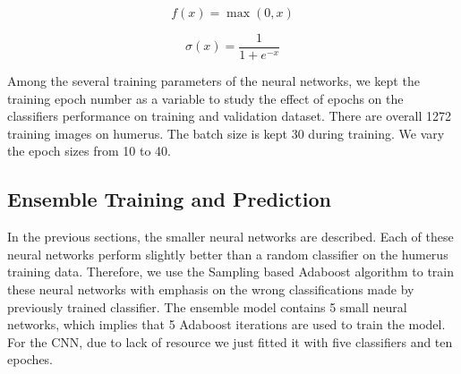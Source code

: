 \documentclass{article}
\begin{document}
\begin{equation}
    f(x)=\max(0,x)
    \label{relu}
\end{equation}

\begin{equation}
    \sigma(x)=\frac{1}{1+e^{-x}}
    \label{sigm}
\end{equation}

Among the several training parameters of the neural networks, we kept the training epoch number as a variable to study the effect of epochs on the classifiers performance on training and validation dataset. There are overall 1272 training images on humerus. The batch size is kept 30 during training. We vary the epoch sizes from 10 to 40.


\subsection{Ensemble Training and Prediction}
In the previous sections, the smaller neural networks are described. Each of these neural networks perform slightly better than a random classifier on the humerus training data. Therefore, we use the Sampling based Adaboost algorithm to train these neural networks with emphasis on the wrong classifications made by previously trained classifier. The ensemble model contains 5 small neural networks, which implies that 5 Adaboost iterations are used to train the model. For the CNN, due to lack of resource we just fitted it with five classifiers and ten epoches. 
\end{document}
